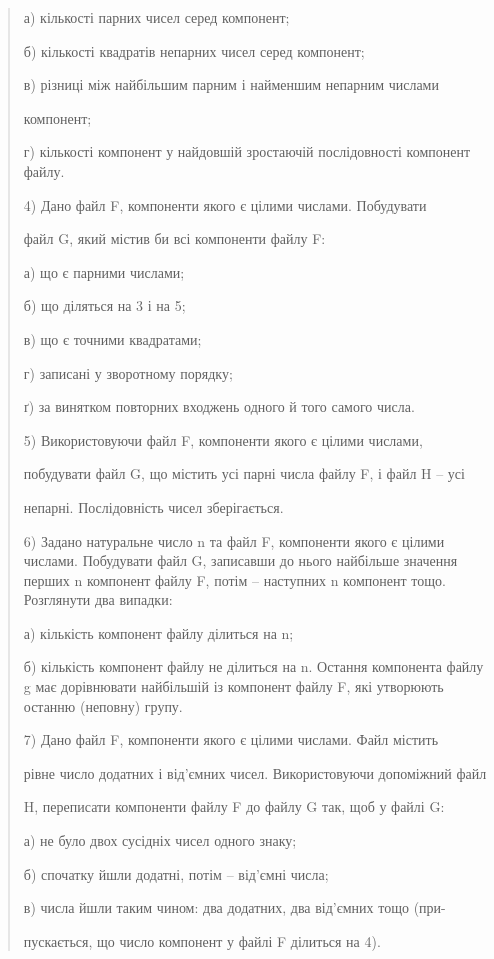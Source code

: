 \documentclass[]{article}
\begin{document}
\begin{quote}
а) кількості парних чисел серед компонент;

б) кількості квадратів непарних чисел серед компонент;

в) різниці між найбільшим парним і найменшим непарним числами

компонент;

г) кількості компонент у найдовшій зростаючій послідовності компонент
файлу.

4) Дано файл F, компоненти якого є цілими числами. Побудувати

файл G, який містив би всі компоненти файлу F:

а) що є парними числами;

б) що діляться на 3 і на 5;

в) що є точними квадратами;

г) записані у зворотному порядку;

ґ) за винятком повторних входжень одного й того самого числа.

5) Використовуючи файл F, компоненти якого є цілими числами,

побудувати файл G, що містить усі парні числа файлу F, і файл H -- усі

непарні. Послідовність чисел зберігається.

6) Задано натуральне число n та файл F, компоненти якого є цілими
числами. Побудувати файл G, записавши до нього найбільше значення перших
n компонент файлу F, потім -- наступних n компонент тощо. Розглянути два
випадки:

а) кількість компонент файлу ділиться на n;

б) кількість компонент файлу не ділиться на n. Остання компонента файлу
g має дорівнювати найбільшій із компонент файлу F, які утворюють останню
(неповну) групу.

7) Дано файл F, компоненти якого є цілими числами. Файл містить

рівне число додатних і від'ємних чисел. Використовуючи допоміжний файл

H, переписати компоненти файлу F до файлу G так, щоб у файлі G:

а) не було двох сусідніх чисел одного знаку;

б) спочатку йшли додатні, потім -- від'ємні числа;

в) числа йшли таким чином: два додатних, два від'ємних тощо (при-

пускається, що число компонент у файлі F ділиться на 4).


\end{quote}
\end{document}
